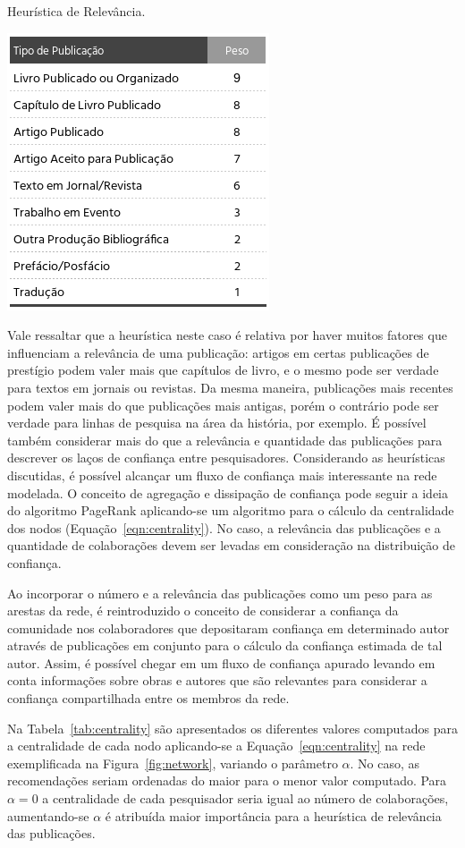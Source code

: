 \documentclass[12pt]{article}
\begin{document}
\begin{table}[ht]
    \centering
    \caption{Heurística de Relevância.}
    \label{tab:relavancy}
    \includegraphics[width=.35\textwidth]{heuristics.png}
\end{table}


Vale ressaltar que a heurística neste caso é relativa por haver muitos fatores que influenciam a relevância de uma publicação: artigos em certas publicações de prestígio podem valer mais que capítulos de livro, e o mesmo pode ser verdade para textos em jornais ou revistas. Da mesma maneira, publicações mais recentes podem valer mais do que publicações mais antigas, porém o contrário pode ser verdade para linhas de pesquisa na área da história, por exemplo. É possível também considerar mais do que a relevância e quantidade das publicações para descrever os laços de confiança entre pesquisadores. Considerando as heurísticas discutidas, é possível alcançar um fluxo de confiança mais interessante na rede modelada. O conceito de agregação e dissipação de confiança pode seguir a ideia do algoritmo PageRank aplicando-se um algoritmo para o cálculo da centralidade dos nodos (Equação~\ref{eqn:centrality}). No caso, a relevância das publicações e a quantidade de colaborações devem ser levadas em consideração na distribuição de confiança.

Ao incorporar o número e a relevância das publicações como um peso para as arestas da rede, é reintroduzido o conceito de considerar a confiança da comunidade nos colaboradores que depositaram confiança em determinado autor através de publicações em  conjunto para o cálculo da confiança estimada de tal autor. Assim, é possível chegar em um fluxo de confiança apurado
levando em conta informações sobre obras e autores que são relevantes para considerar a confiança compartilhada entre os membros da rede.

Na Tabela~\ref{tab:centrality} são apresentados os diferentes valores computados para a centralidade de cada nodo aplicando-se a Equação~\ref{eqn:centrality} na rede exemplificada na Figura~\ref{fig:network}, variando o parâmetro $\alpha$. No caso, as recomendações seriam ordenadas do maior para o menor valor computado. Para $\alpha = 0$ a centralidade de cada pesquisador seria igual ao número de colaborações, aumentando-se $\alpha$ é atribuída maior importância para a heurística de relevância das publicações.
\end{document}
